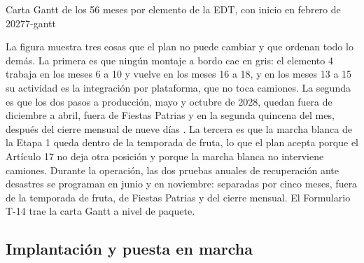 \begin{figuraNativa}[!htbp]{Carta Gantt de los 56 meses por elemento de la EDT, con inicio en febrero de 2027}{7-gantt}
\end{figuraNativa}

La figura muestra tres cosas que el plan no puede cambiar y que ordenan todo lo demás. La primera es que
ningún montaje a bordo cae en gris: el elemento 4 trabaja en los meses 6 a 10 y vuelve en los meses 16 a 18,
y en los meses 13 a 15 su actividad es la integración por plataforma, que no toca camiones. La segunda es
que los dos pasos a producción, mayo y octubre de 2028, quedan fuera de diciembre a abril, fuera de
Fiestas Patrias y en la segunda quincena del mes, después del cierre mensual de nueve días
. La tercera es que la marcha blanca de la Etapa 1 queda dentro de la temporada de
fruta, lo que el plan acepta porque el Artículo 17 no deja otra posición y porque la marcha blanca no
interviene camiones. Durante la operación, las dos pruebas anuales de recuperación ante desastres
 se programan en junio y en noviembre: separadas por cinco meses, fuera de la temporada de fruta, de
Fiestas Patrias y del cierre mensual. El Formulario T-14 trae la carta Gantt a nivel de paquete.

\subsection{Implantación y puesta en marcha}\label{sec:7-implantacion}

